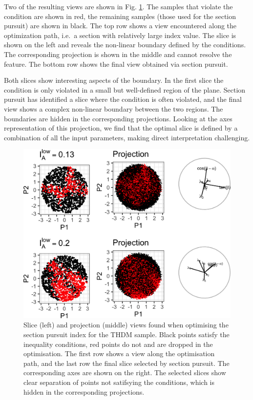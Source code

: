 \documentclass[]{interact}
\theoremstyle{plain}%
\theoremstyle{definition}
\theoremstyle{remark}
\begin{document}
Two of the resulting views are shown in Fig. \ref{fig:thdm}. The samples
that violate the condition are shown in red, the remaining samples
(those used for the section pursuit) are shown in black. The top row
shows a view encountered along the optimization path, i.e.~a section
with relatively large index value. The slice is shown on the left and
reveals the non-linear boundary defined by the conditions. The
corresponding projection is shown in the middle and cannot resolve the
feature. The bottom row shows the final view obtained via section
pursuit.

Both slices show interesting aspects of the boundary. In the first slice
the condition is only violated in a small but well-defined region of the
plane. Section pursuit has identified a slice where the condition is
often violated, and the final view shows a complex non-linear boundary
between the two regions. The boundaries are hidden in the corresponding
projections. Looking at the axes representation of this projection, we
find that the optimal slice is defined by a combination of all the input
parameters, making direct interpretation challenging.

\begin{figure}
\includegraphics[width=1\linewidth]{section_pursuit_files/figure-latex/thdm-1} \caption{Slice (left) and projection (middle) views found when optimising the section pursuit index for the THDM sample. Black points satisfy the inequality conditions, red points do not and are dropped in the optimisation. The first row shows a view along the optimisation path, and the last row the final slice selected by section pursuit. The corresponding axes are shown on the right. The selected slices show clear separation of points not satifsying the conditions, which is hidden in the corresponding projections.}\label{fig:thdm}
\end{figure}
\end{document}
